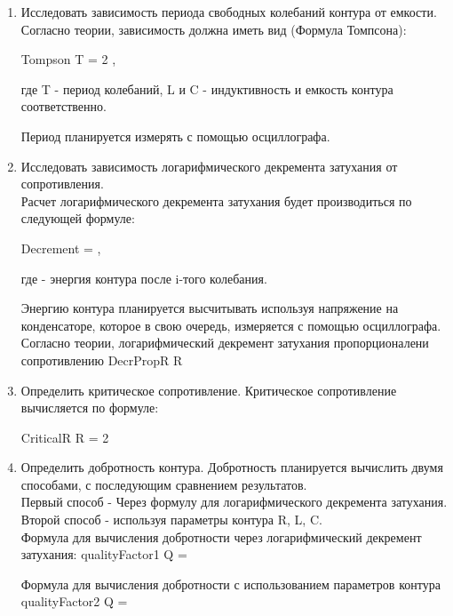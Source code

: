 \begin{enumerate}
    \item Исследовать зависимость периода свободных колебаний контура от емкости. Согласно теории, зависимость должна иметь вид (Формула Томпсона):

    \formula
    {}
    {Tompson}
    {T = 2\pi {} \quad,}

    где T - период колебаний, L и C - индуктивность и емкость контура соответственно.

    Период планируется измерять с помощью осциллографа.

    \item Исследовать зависимость логарифмического декремента затухания от сопротивления. \\ Расчет логарифмического декремента затухания будет производиться по следующей формуле:

    \formula
    {}
    {Decrement}
    {\lambda =  \ln{} \quad,}

    где  - энергия контура после i-того колебания.

    Энергию контура планируется высчитывать используя напряжение на конденсаторе, которое в свою очередь, измеряется с помощью осциллографа. \\

    \formula
    {Согласно теории, логарифмический декремент затухания пропорционалени сопротивлению}
    {DecrPropR}
    {\lambda \propto R}

    \newpage

    \item Определить критическое сопротивление. Критическое сопротивление вычисляется по формуле:

    \formula
    {}
    {CriticalR}
    {R = 2}

    \item Определить добротность контура. Добротность планируется вычислить двумя способами, с последующим сравнением результатов. \\

    Первый способ - Через формулу для логарифмического декремента затухания. \\
    Второй способ - используя параметры контура R, L, C. \\[0.1cm]

    \formula
    {Формула для вычисления добротности через логарифмический декремент затухания:}
    {qualityFactor1}
    {Q = \frac{\pi}{\lambda}}

    \formula
    {Формула для вычисления добротности с использованием параметров контура}
    {qualityFactor2}
    {Q =  }

\end{enumerate}

